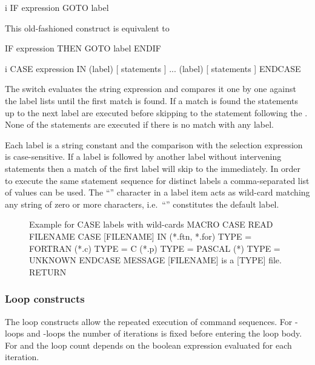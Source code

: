 \begin{Gray}{i}
IF expression GOTO label
\end{Gray}
This old-fashioned construct is equivalent to
\begin{XMP}
IF expression THEN
   GOTO label
ENDIF
\end{XMP}


\label{ref:CASE}
 
 
\begin{Gray}{i}
CASE expression IN
(label)  [ statements ]
...
(label)  [ statements ]
ENDCASE
\end{Gray}
The  switch evaluates the string expression and compares it
one by one against the label lists until the first match is found.
If a match is found the statements up to the next label are
executed before skipping to the statement following the .
None of the statements are executed if there is no match with any label.

Each label is a string constant and the comparison with the selection
expression is case-sensitive.
If a label is followed by another label without intervening statements
then a match of the first label will skip to the  immediately.
In order to execute the same statement sequence for distinct labels
a comma-separated list of values can be used.
The ``\Lit{*}'' character in a label item acts as wild-card matching any
string of zero or more characters, i.e.\ ``\Lit{(*)}'' constitutes the
default label.
 
\begin{figure}[htb]\centering
\begin{XMPt}{Example for CASE labels with wild-cards}
   MACRO CASE
      READ FILENAME
      CASE [FILENAME] IN
      (*.ftn, *.for)  TYPE = FORTRAN
      (*.c)           TYPE = C
      (*.p)           TYPE = PASCAL
      (*)             TYPE = UNKNOWN
      ENDCASE
      MESSAGE [FILENAME] is a [TYPE] file.
   RETURN
\end{XMPt}
\end{figure}
 

\subsubsection{Loop constructs}

The loop constructs allow the repeated execution of command sequences.
For -loops and -loops the number of iterations
is fixed before entering the loop body.
For  and  the loop count depends on the boolean
expression evaluated for each iteration.


